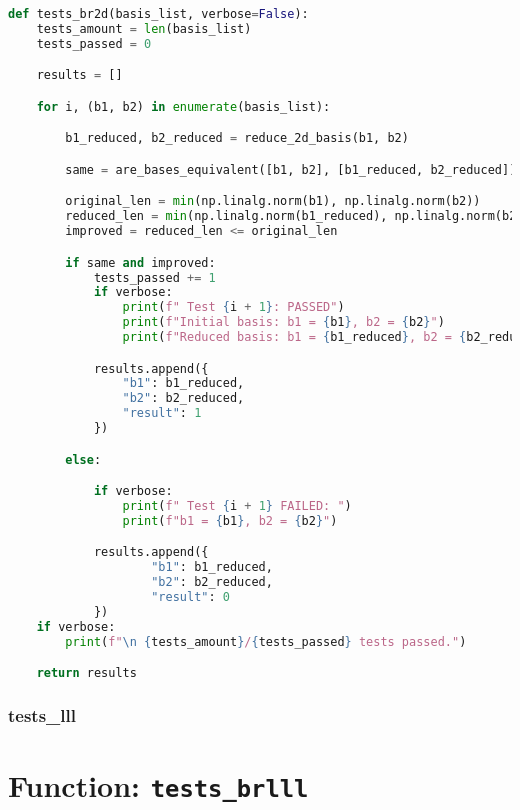 \documentclass[a4paper,12pt]{article}
\begin{document}
\begin{lstlisting}[language=Python]
def tests_br2d(basis_list, verbose=False):
    tests_amount = len(basis_list)
    tests_passed = 0

    results = []

    for i, (b1, b2) in enumerate(basis_list):

        b1_reduced, b2_reduced = reduce_2d_basis(b1, b2)

        same = are_bases_equivalent([b1, b2], [b1_reduced, b2_reduced])

        original_len = min(np.linalg.norm(b1), np.linalg.norm(b2))
        reduced_len = min(np.linalg.norm(b1_reduced), np.linalg.norm(b2_reduced))
        improved = reduced_len <= original_len

        if same and improved:
            tests_passed += 1
            if verbose:
                print(f" Test {i + 1}: PASSED")
                print(f"Initial basis: b1 = {b1}, b2 = {b2}")
                print(f"Reduced basis: b1 = {b1_reduced}, b2 = {b2_reduced}")

            results.append({
                "b1": b1_reduced,
                "b2": b2_reduced,
                "result": 1
            })

        else:

            if verbose:
                print(f" Test {i + 1} FAILED: ")
                print(f"b1 = {b1}, b2 = {b2}")

            results.append({
                    "b1": b1_reduced,
                    "b2": b2_reduced,
                    "result": 0
            })
    if verbose:
        print(f"\n {tests_amount}/{tests_passed} tests passed.")

    return results
\end{lstlisting}







\subsubsection{tests\_lll}

\section*{Function: \texttt{tests\_brlll}}
\end{document}
